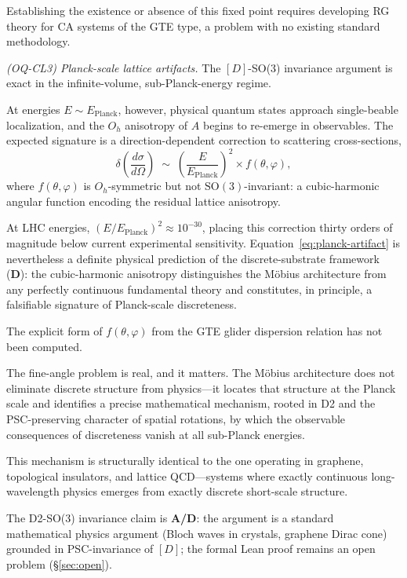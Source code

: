 \documentclass[12pt,letterpaper]{article}
\newcommand{\Dclass}{[D]}
\newcommand{\catAD}{\textbf{A/D}}
\newcommand{\catD}{\textbf{D}}
\begin{document}
Establishing the existence or absence of this fixed point requires developing RG theory
for CA systems of the GTE type, a problem with no existing standard methodology.

\textit{(OQ-CL3) Planck-scale lattice artifacts.}
The $\Dclass$-SO(3) invariance argument is exact in the infinite-volume,
sub-Planck-energy regime.

At energies $E \sim E_{\mathrm{Planck}}$, however, physical quantum states approach
single-beable localization, and the $O_h$ anisotropy of $A$ begins to re-emerge in
observables.  The expected signature is a direction-dependent correction to scattering
cross-sections,
\begin{equation}
  \delta\!\left(\frac{d\sigma}{d\Omega}\right)
  \;\sim\;
  \left(\frac{E}{E_{\mathrm{Planck}}}\right)^{\!2} \times f(\theta,\varphi),
  \label{eq:planck-artifact}
\end{equation}
where $f(\theta,\varphi)$ is $O_h$-symmetric but not $\mathrm{SO}(3)$-invariant:
a cubic-harmonic angular function encoding the residual lattice anisotropy.

At LHC energies, $(E/E_{\mathrm{Planck}})^2 \approx 10^{-30}$, placing this
correction thirty orders of magnitude below current experimental sensitivity.
Equation~\eqref{eq:planck-artifact} is nevertheless a definite physical prediction
of the discrete-substrate framework (\catD): the cubic-harmonic anisotropy
distinguishes the M\"{o}bius architecture from any perfectly continuous fundamental theory
and constitutes, in principle, a falsifiable signature of Planck-scale discreteness.

The explicit form of $f(\theta,\varphi)$ from the GTE glider dispersion relation has
not been computed.

The fine-angle problem is real, and it matters.  The M\"{o}bius architecture does not
eliminate discrete structure from physics---it locates that structure at the Planck
scale and identifies a precise mathematical mechanism, rooted in D2 and the
PSC-preserving character of spatial rotations, by which the observable consequences
of discreteness vanish at all sub-Planck energies.

This mechanism is structurally identical to the one operating in graphene,
topological insulators, and lattice QCD---systems where exactly continuous
long-wavelength physics emerges from exactly discrete short-scale structure.

The D2-SO(3) invariance claim is \catAD: the argument is a standard mathematical
physics argument (Bloch waves in crystals, graphene Dirac cone) grounded in
PSC-invariance of $\Dclass$; the formal Lean proof remains an open problem
(\S\ref{sec:open}).
\end{document}
